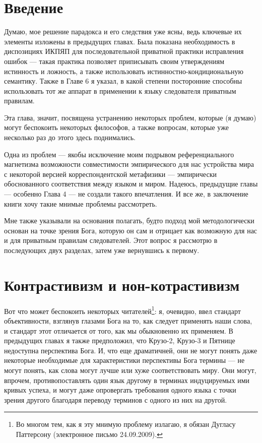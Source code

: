 \documentclass[11pt]{book}
\begin{document}
\section{Введение}

Думаю, мое решение парадокса и его следствия уже ясны, ведь ключевые их элементы изложены в предыдущих главах. Была показана необходимость в диспозициях ИКПЯП для последовательной приватной практики исправления ошибок --- такая практика позволяет приписывать своим утверждениям истинность и ложность, а также использовать истинностно-кондициональную семантику. Также в Главе 6 я указал, в какой степени посторонние способны использовать тот же аппарат в применении к языку следователя приватным правилам.

Эта глава, значит, посвящена устранению некоторых проблем, которые (я думаю) могут беспокоить некоторых философов, а также вопросам, которые уже несколько раз до этого здесь поднимались.

Одна из проблем --- якобы исключение моим подрывом референциального магнетизма возможности совместимости эмпирического для нас устройства мира с некоторой версией корреспондентской метафизики --- эмпирически обоснованного соответствия между языком и миром. Надеюсь, предыдущие главы --- особенно Глава 4 --- не создали такого впечатления. И все же, в заключение книги хочу такие мнимые проблемы рассмотреть.

Мне также указывали на основания полагать, будто подход мой методологически основан на точке зрения Бога, которую он сам и отрицает как возможную для нас и для приватным правилам следователей. Этот вопрос я рассмотрю в последующих двух разделах, затем уже вернувшись к первому.

\section{Контрастивизм и нон-котрастивизм}

Вот что может беспокоить некоторых читателей\footnote{Во многом тем, как я эту мнимую проблему излагаю, я обязан Дугласу Паттерсону (электронное письмо 24.09.2009).}: я, очевидно, ввел стандарт объективности, взглянув глазами Бога на то, как следует применять наши слова, и стандарт этот отличается от того, как мы обыкновенно их применяем. В предыдущих главах я также предположил, что Крузо-2, Крузо-3 и Пятнице недоступна перспектива Бога. И, что еще драматичней, они не могут понять даже некоторые необходимые для характеристики перспективы Бога термины --- не могут понять, как слова могут лучше или хуже соответствовать миру. Они могут, впрочем, противопоставлять один язык другому в терминах индуцируемых ими кривых успеха, и могут даже опровергать требования одного языка с точки зрения другого благодаря переводу терминов с одного из них на другой.
\end{document}
